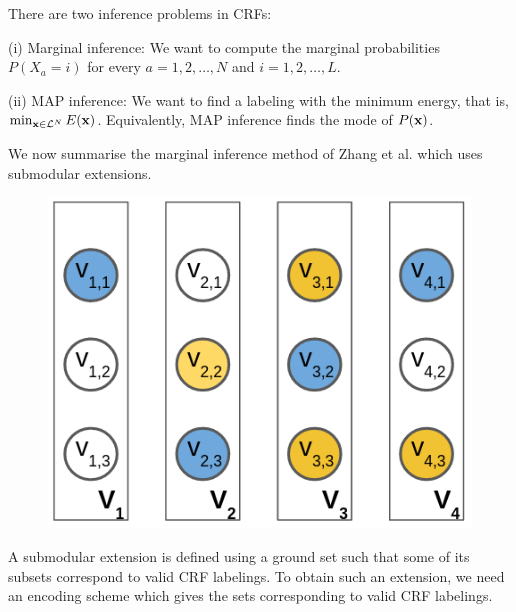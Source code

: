  There are two inference problems in CRFs: 

(i) Marginal inference: We want to compute the marginal probabilities $P(X_a = i)$ for every $a = 1, 2, \dots, N$ and $i = 1, 2, \dots, L$.

(ii) MAP inference: We want to find a labeling with the minimum energy, that is, $\min_{{\bf x} \in {\mathcal L}^N} E({\bf x})$. Equivalently, MAP inference finds the mode of $P({\bf x})$.

\label{sec:review}
We now summarise the marginal inference method of Zhang et al. \citep{zhang2015higher} which
uses submodular extensions.

\begin{figure}
\centering
\includegraphics[scale = 0.30]{./figures/1_of_L.png}
\label{fig:encoding}
\end{figure}

 A submodular extension is defined using
a ground set such that some of its subsets correspond to valid CRF labelings.
To obtain such an extension, we need an encoding scheme which gives the sets corresponding to valid CRF labelings. 

